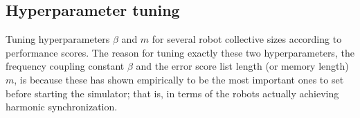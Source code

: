 	\subsection{Hyperparameter tuning}
	Tuning hyperparameters $\beta$ and $m$ for several robot collective sizes according to performance scores. The reason for tuning exactly these two hyperparameters, the frequency coupling constant $\beta$ and the error score list length (or memory length) $m$, is because these has shown empirically to be the most important ones to set before starting the simulator; that is, in terms of the robots actually achieving harmonic synchronization.